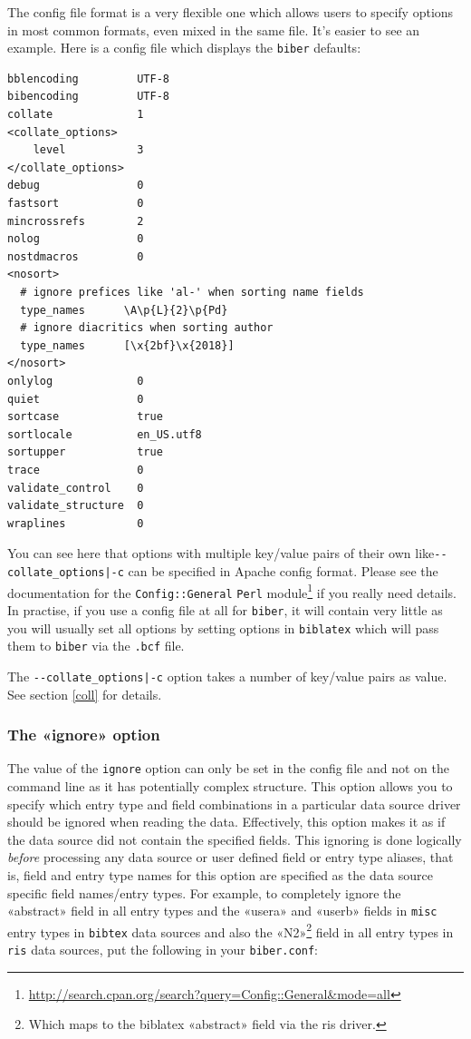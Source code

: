 \documentclass{ltxdockit}
\begin{document}
\noindent The config file format is a very flexible one which allows users to specify
options in most common formats, even mixed in the same file. It's easier to
see an example. Here is a config file which displays the \verb+biber+
defaults:

\begin{verbatim}
bblencoding         UTF-8
bibencoding         UTF-8
collate             1
<collate_options>
    level           3
</collate_options>
debug               0
fastsort            0
mincrossrefs        2
nolog               0
nostdmacros         0
<nosort>
  # ignore prefices like 'al-' when sorting name fields
  type_names      \A\p{L}{2}\p{Pd}
  # ignore diacritics when sorting author
  type_names      [\x{2bf}\x{2018}]
</nosort>
onlylog             0
quiet               0
sortcase            true
sortlocale          en_US.utf8
sortupper           true
trace               0
validate_control    0
validate_structure  0
wraplines           0
\end{verbatim}

\noindent You can see here that options with multiple key/value pairs of
their own like\linebreak[4] \verb+--collate_options|-c+ can be specified in
Apache config format. Please see the documentation
for the \verb+Config::General+ \verb+Perl+
module\footnote{\url{http://search.cpan.org/search?query=Config::General&mode=all}}
if you really need details. In practise, if you use a config file at all
for \verb+biber+, it will contain very little as you will usually set all
options by setting options in \verb+biblatex+ which will pass them to
\verb+biber+ via the \verb+.bcf+ file.

The \verb+--collate_options|-c+ option takes a number of key/value pairs as
value. See section \ref{coll} for details.

\subsubsection{The «ignore» option}

The value of the \verb+ignore+ option can only be set in the config file
and not on the command line as it has potentially complex structure. This
option allows you to specify which entry type and field combinations in a
particular data source driver should be ignored when reading the data.
Effectively, this option makes it as if the data source did not contain the
specified fields. This ignoring is done logically \emph{before} processing
any data source or user defined field or entry type aliases, that is, field
and entry type names for this option are specified as the data source
specific field names/entry types. For example, to completely ignore the
«abstract» field in all entry types and the «usera» and «userb» fields in
\verb+misc+ entry types in \verb+bibtex+ data sources and also the
«N2»\footnote{Which maps to the biblatex «abstract» field via the ris
  driver.} field in all entry types in \verb+ris+ data sources, put the
following in your \verb+biber.conf+:
\end{document}

